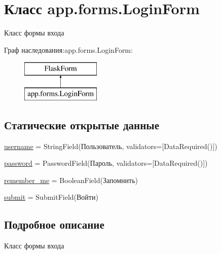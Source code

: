 \hypertarget{classapp_1_1forms_1_1_login_form}{}\section{Класс app.\+forms.\+Login\+Form}
\label{classapp_1_1forms_1_1_login_form}


Класс формы входа  


Граф наследования\+:app.\+forms.\+Login\+Form\+:\begin{figure}[H]
\begin{center}
\leavevmode
\includegraphics[height=2.000000cm]{classapp_1_1forms_1_1_login_form}
\end{center}
\end{figure}
\subsection*{Статические открытые данные}
\begin{DoxyCompactItemize}
\item 
\mbox{\hyperlink{classapp_1_1forms_1_1_login_form_acc32a2914184aa30d464bf3ae29d3fe8}{username}} = String\+Field(\textquotesingle{}Пользователь\textquotesingle{}, validators=\mbox{[}Data\+Required()\mbox{]})
\item 
\mbox{\hyperlink{classapp_1_1forms_1_1_login_form_a53abb2f26f647359d44d7ef5fc2756d7}{password}} = Password\+Field(\textquotesingle{}Пароль\textquotesingle{}, validators=\mbox{[}Data\+Required()\mbox{]})
\item 
\mbox{\hyperlink{classapp_1_1forms_1_1_login_form_ad2b8871e15dc50fc2d21fc937a2dc2f1}{remember\+\_\+me}} = Boolean\+Field(\textquotesingle{}Запомнить\textquotesingle{})
\item 
\mbox{\hyperlink{classapp_1_1forms_1_1_login_form_aeedc9621e8588a0fd186fefc813f2bda}{submit}} = Submit\+Field(\textquotesingle{}Войти\textquotesingle{})
\end{DoxyCompactItemize}


\subsection{Подробное описание}
Класс формы входа 


